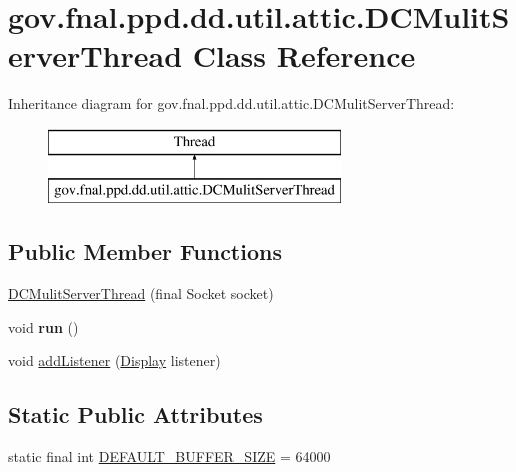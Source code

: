 \hypertarget{classgov_1_1fnal_1_1ppd_1_1dd_1_1util_1_1attic_1_1DCMulitServerThread}{\section{gov.\-fnal.\-ppd.\-dd.\-util.\-attic.\-D\-C\-Mulit\-Server\-Thread Class Reference}
\label{classgov_1_1fnal_1_1ppd_1_1dd_1_1util_1_1attic_1_1DCMulitServerThread}
}
Inheritance diagram for gov.\-fnal.\-ppd.\-dd.\-util.\-attic.\-D\-C\-Mulit\-Server\-Thread\-:\begin{figure}[H]
\begin{center}
\leavevmode
\includegraphics[height=2.000000cm]{classgov_1_1fnal_1_1ppd_1_1dd_1_1util_1_1attic_1_1DCMulitServerThread}
\end{center}
\end{figure}
\subsection*{Public Member Functions}
\begin{DoxyCompactItemize}
\item 
\hyperlink{classgov_1_1fnal_1_1ppd_1_1dd_1_1util_1_1attic_1_1DCMulitServerThread_a9a22df034be7d152731f6dd07bdd4729}{D\-C\-Mulit\-Server\-Thread} (final Socket socket)
\item 
\hypertarget{classgov_1_1fnal_1_1ppd_1_1dd_1_1util_1_1attic_1_1DCMulitServerThread_a54bb9e6b34b7a59d88205d9960595c88}{void {\bfseries run} ()}\label{classgov_1_1fnal_1_1ppd_1_1dd_1_1util_1_1attic_1_1DCMulitServerThread_a54bb9e6b34b7a59d88205d9960595c88}

\item 
void \hyperlink{classgov_1_1fnal_1_1ppd_1_1dd_1_1util_1_1attic_1_1DCMulitServerThread_aa6e9861310dff011e7aa4b377ad2d57a}{add\-Listener} (\hyperlink{interfacegov_1_1fnal_1_1ppd_1_1dd_1_1signage_1_1Display}{Display} listener)
\end{DoxyCompactItemize}
\subsection*{Static Public Attributes}
\begin{DoxyCompactItemize}
\item 
static final int \hyperlink{classgov_1_1fnal_1_1ppd_1_1dd_1_1util_1_1attic_1_1DCMulitServerThread_a6d2b224dfd806a916b2d21041777f00b}{D\-E\-F\-A\-U\-L\-T\-\_\-\-B\-U\-F\-F\-E\-R\-\_\-\-S\-I\-Z\-E} = 64000
\end{DoxyCompactItemize}
